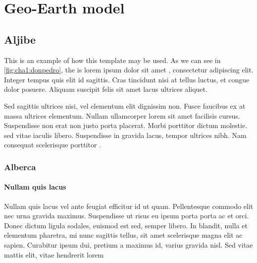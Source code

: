 % 
% 
% 



\clearpage
\cleardoublepage

\chapter{Geo-Earth model}

\section{Aljibe}

This is an example of how this template may be used. As we can see in \autoref{fig:cha1:donpedro}, the  is lorem ipsum dolor sit amet  \cite{ESP32_DATASHEET}, consectetur adipiscing elit. Integer tempus quis elit id sagittis. Cras tincidunt nisi at tellus luctus, et congue dolor posuere. Aliquam suscipit felis sit amet lacus ultrices aliquet.

Sed sagittis ultrices nisi, vel elementum elit dignissim non. Fusce faucibus ex at massa ultrices elementum. Nullam ullamcorper lorem sit amet facilisis cursus. Suspendisse non erat non justo porta placerat. Morbi porttitor dictum molestie.  sed vitae iaculis libero. Suspendisse in gravida lacus, tempor ultrices nibh. Nam consequat scelerisque porttitor \cite{SOLDERDEFECTS}.

\subsection{Alberca}

\subsubsection{Nullam quis lacus}

Nullam quis lacus vel ante feugiat efficitur id ut quam. Pellentesque commodo elit nec urna gravida maximus. Suspendisse ut risus eu ipsum porta porta ac et orci. Donec dictum ligula sodales, euismod est sed, semper libero. In blandit, nulla et elementum pharetra, mi nunc sagittis tellus, sit amet scelerisque magna elit ac sapien. Curabitur ipsum dui, pretium a maximus id, varius gravida nisl. Sed vitae mattis elit, vitae hendrerit lorem

